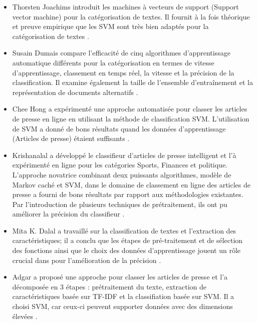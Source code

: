      \begin{itemize}[leftmargin={0.7cm}]
        
     \item Thorsten Joachims introduit les machines à vecteurs de support (Support vector machine) pour la catégorisation de textes. Il fournit à la fois théorique et preuve empirique que les SVM sont très bien adaptés pour la catégorisation de textes \cite{itemetat1}. 
     
     \item Susain Dumais compare l'efficacité de cinq algorithmes d'apprentissage automatique différents pour la catégorisation en termes de vitesse d'apprentissage, classement en temps réel, la vitesse et la précision de la classification. Il examine également la taille de l'ensemble d'entraînement et la représentation de documents alternatifs \cite{itemetat2}.
     
     \item Chee Hong a expérimenté une approche automatisée pour classer les articles de presse en ligne en utilisant la méthode de classification SVM. L'utilisation de SVM a donné de bons résultats quand les données d'apprentissage (Articles de presse) étaient suffisants \cite{itemetat3}.
      
     \item Krishanalal a développé le classifieur d'articles de presse intelligent et l'à expérimenté en ligne pour les catégories Sports, Finances et politique. L'approche novatrice combinant deux puissants algorithmes, modèle de Markov caché et SVM, dans le domaine de classement en ligne des articles de presse a fourni de bons résultats par rapport aux méthodologies existantes. Par l'introduction de plusieurs techniques de prétraitement, ils ont pu améliorer la précision du classifieur \cite{itemetat6}.
     
     \item Mita K. Dalal a travaillé sur la classification de textes et l'extraction des caractéristiques; il a conclu que les étapes de pré-traitement et de sélection des fonctions ainsi que le choix des données d'apprentissage jouent un rôle crucial dans pour l'amélioration de la précision \cite{itemetat7}. 
     
     \item Adgar a proposé une approche pour classer les articles de presse et l'a décomposée en 3 étapes : prétraitement du texte, extraction de caractéristiques basée sur TF-IDF et la classifiation basée sur SVM.
     Il a choisi SVM, car ceux-ci peuvent supporter données avec des dimensions élevées \cite{itemetat8}.
     
     \end{itemize}
        

